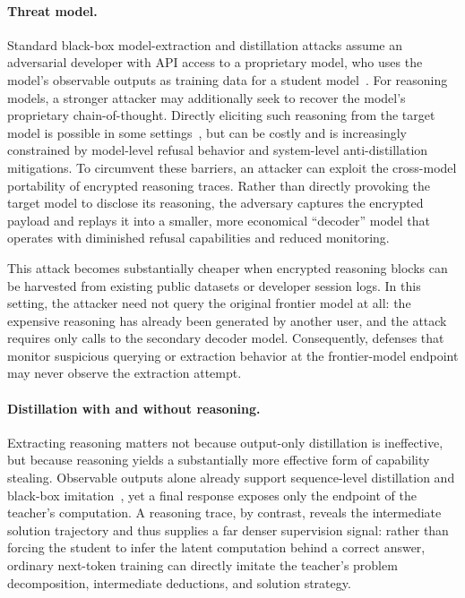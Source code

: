 
\paragraph{Threat model.}
Standard black-box model-extraction and distillation attacks assume an adversarial developer with API access to a proprietary model, who uses the model's observable outputs as training data for a student model~\citep{tramer2016stealing}. For reasoning models, a stronger attacker may additionally seek to recover the model's proprietary chain-of-thought. Directly eliciting such reasoning from the target model is possible in some settings~\citep{anthropic2026distillation}, but can be costly and is increasingly constrained by model-level refusal behavior and system-level anti-distillation mitigations. To circumvent these barriers, an attacker can exploit the cross-model portability of encrypted reasoning traces. Rather than directly provoking the target model to disclose its reasoning, the adversary captures the encrypted payload and replays it into a smaller, more economical ``decoder'' model that operates with diminished refusal capabilities and reduced monitoring.

This attack becomes substantially cheaper when encrypted reasoning blocks can be harvested from existing public datasets or developer session logs. In this setting, the attacker need not query the original frontier model at all: the expensive reasoning has already been generated by another user, and the attack requires only calls to the secondary decoder model. Consequently, defenses that monitor suspicious querying or extraction behavior at the frontier-model endpoint may never observe the extraction attempt.


\paragraph{Distillation with and without reasoning.}
Extracting reasoning matters not because output-only distillation is ineffective, but because reasoning yields a substantially more effective form of capability stealing. Observable outputs alone already support sequence-level distillation and black-box imitation~\citep{kim2016sequence,wallace2020imitation,gudibande2023falsepromise,ye2025blackbox}, yet a final response exposes only the endpoint of the teacher's computation. A reasoning trace, by contrast, reveals the intermediate solution trajectory and thus supplies a far denser supervision signal: rather than forcing the student to infer the latent computation behind a correct answer, ordinary next-token training can directly imitate the teacher's problem decomposition, intermediate deductions, and solution strategy. 

